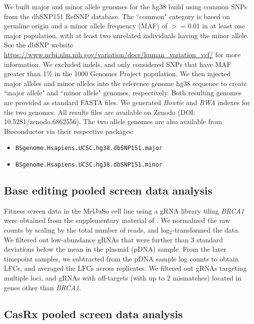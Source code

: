 \documentclass[pdftex,english,10pt]{article}
\begin{document}
{We built major and minor allele genomes for the hg38 build using common SNPs from the dbSNP151 RefSNP database. The ``common" category is based on germline origin and a minor allele frequency (MAF) of $>=0.01$ in at least one major population, with at least two unrelated individuals having the minor allele. See the dbSNP website \url{https://www.ncbi.nlm.nih.gov/variation/docs/human_variation_vcf/} for more information. We excluded indels, and only considered SNPs that have MAF greater than 1\% in the 1000 Genomes Project population. We then injected major alleles and minor alleles into the reference genome hg38 sequence to create ``major allele" and ``minor allele" genomes, respectively. Both resulting genomes are provided as standard FASTA files. We generated \textit{Bowtie} and \textit{BWA} indexes for the two genomes. All results files are available on Zenodo (DOI: 10.5281/zenodo.6862556). The two allele genomes are also available from Bioconductor via their respective packages:

\begin{itemize}
\item \texttt{BSgenome.Hsapiens.UCSC.hg38.dbSNP151.major} \citep{bsgenome_major}
\item \texttt{BSgenome.Hsapiens.UCSC.hg38.dbSNP151.minor} \citep{bsgenome_minor}
\end{itemize}


\subsection*{Base editing pooled screen data analysis}

Fitness screen data in the MelJuSo cell line using a gRNA library tiling \textit{BRCA1} were obtained from the supplementary material of \citet{hanna2021massively}. We normalized the raw counts by scaling by the total number of reads, and log$_2$-transformed the data. We filtered out low-abundance gRNAs that were further than 3 standard deviations below the mean in the plasmid (pDNA) sample. From the later timepoint samples, we subtracted from the pDNA sample log counts to obtain LFCs, and averaged the LFCs across replicates. We filtered out gRNAs targeting multiple loci, and gRNAs with off-targets (with up to 2 mismatches) located in genes other than \textit{BRCA1}.  




\subsection*{CasRx pooled screen data analysis}

}
\end{document}
